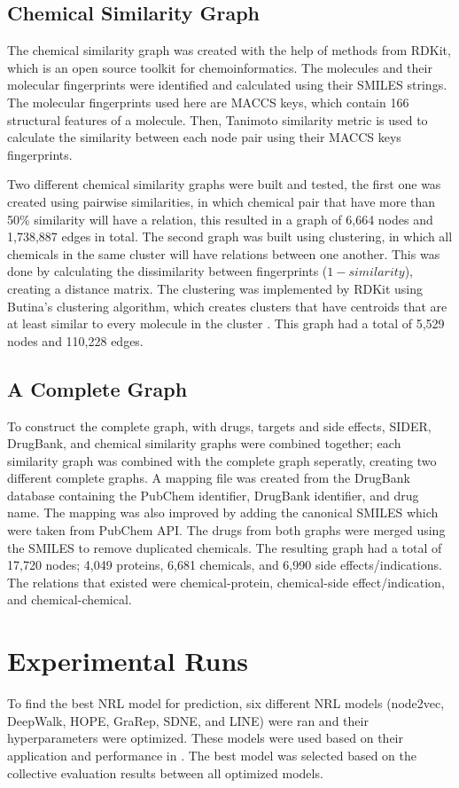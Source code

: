 \subsection{Chemical Similarity Graph}
The chemical similarity graph was created with the help of methods from RDKit, which is an open source toolkit for chemoinformatics. The molecules and their molecular fingerprints were identified and calculated using their \ac{SMILES} strings. The molecular fingerprints used here are MACCS keys, which contain 166 structural features of a molecule. Then, Tanimoto similarity metric is used to calculate the similarity between each node pair using their MACCS keys fingerprints. 

Two different chemical similarity graphs were built and tested, the first one was created using pairwise similarities, in which chemical pair that have more than 50\% similarity will have a relation, this resulted in a graph of 6,664 nodes and 1,738,887 edges in total. The second graph was built using clustering, in which all chemicals in the same cluster will have relations between one another. This was done by calculating the dissimilarity between fingerprints ($1 - similarity$), creating a distance matrix. The clustering was implemented by RDKit using Butina's clustering algorithm, which creates clusters that have centroids that are at least similar to every molecule in the cluster \cite{butina_unsupervised_1999}. This graph had a total of 5,529 nodes and 110,228 edges.

\subsection{A Complete Graph}
To construct the complete graph, with drugs, targets and side effects, \ac{SIDER}, DrugBank, and chemical similarity graphs were combined together; each similarity graph was combined with the complete graph seperatly, creating two different complete graphs. A mapping file was created from the DrugBank database containing the PubChem identifier, DrugBank identifier, and drug name. The mapping was also improved by adding the canonical \ac{SMILES} which were taken from PubChem API. The drugs from both graphs were merged using the SMILES to remove duplicated chemicals. The resulting graph had a total of 17,720 nodes; 4,049 proteins, 6,681 chemicals, and 6,990 side effects/indications. The relations that existed were chemical-protein, chemical-side effect/indication, and chemical-chemical.

\section{Experimental Runs}
To find the best \ac{NRL} model for prediction, six different \ac{NRL} models (node2vec, DeepWalk, \ac{HOPE}, \ac{GraRep}, \ac{SDNE}, and \ac{LINE}) were ran and their hyperparameters were optimized. These models were used based on their application and performance in \cite{yue_graph_2019}. The best model was selected based on the collective evaluation results between all optimized models. 

